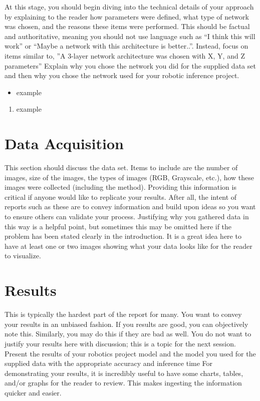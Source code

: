 \documentclass[10pt,journal,compsoc]{IEEEtran}
\begin{document}
		At this stage, you should begin diving into the technical details of your approach by explaining to the reader how parameters were defined, what type of network was chosen, and the reasons these items were performed. This should be factual and authoritative, meaning you should not use language such as “I think this will work” or “Maybe a network with this architecture is better..”. Instead, focus on items similar to, ”A 3-layer network architecture was chosen with X, Y, and Z parameters” 
		Explain why you chose the network you did for the supplied data set and then why you chose the network used for your robotic inference project.
		
		
		\begin{itemize}
			\item example
			\end {itemize}
			
			
			
			\begin{enumerate}
				\item example
				
			\end{enumerate}
			
		\section{Data Acquisition}
		This section should discuss the data set. Items to include are the number of images, size of the images, the types of images (RGB, Grayscale, etc.), how these images were collected (including the method). Providing this information is critical if anyone would like to replicate your results. After all, the intent of reports such as these are to convey information and build upon ideas so you want to ensure others can validate your process.
		Justifying why you gathered data in this way is a helpful point, but sometimes this may be omitted here if the problem has been stated clearly in the introduction.
		It is a great idea here to have at least one or two images showing what your data looks like for the reader to visualize.
			
		\section{Results}
		This is typically the hardest part of the report for many. You want to convey your results in an unbiased fashion. If you results are good, you can objectively note this. Similarly, you may do this if they are bad as well. You do not want to justify your results here with discussion; this is a topic for the next session. 
		Present the results of your robotics project model and the model you used for the supplied data with the appropriate accuracy and inference time
		For demonstrating your results, it is incredibly useful to have some charts, tables, and/or graphs for the reader to review. This makes ingesting the information quicker and easier.
			
\end{document}
